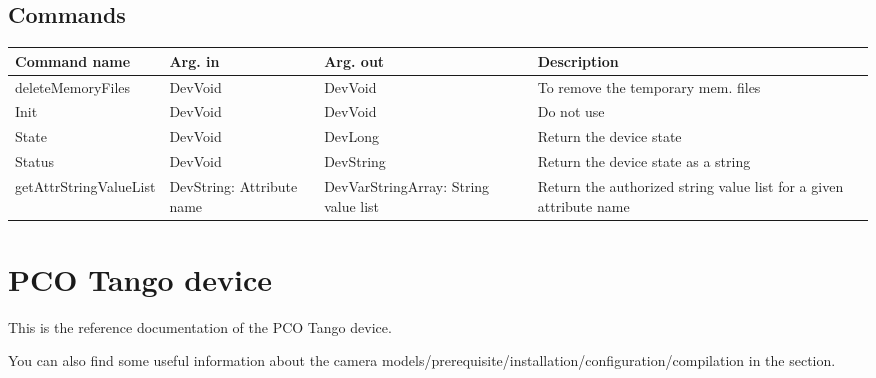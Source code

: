 \documentclass[letterpaper,10pt,english]{sphinxmanual}
\begin{document}
\section{Commands}
\label{Hamamatsu/hamamatsu:commands}
\begin{tabulary}{\linewidth}{|L|L|L|L|}
\hline
\textsf{\relax 
Command name
} & \textsf{\relax 
Arg. in
} & \textsf{\relax 
Arg. out
} & \textsf{\relax 
Description
}\\
\hline
deleteMemoryFiles
 & 
DevVoid
 & 
DevVoid
 & 
To remove the temporary mem. files
\\
\hline
Init
 & 
DevVoid
 & 
DevVoid
 & 
Do not use
\\
\hline
State
 & 
DevVoid
 & 
DevLong
 & 
Return the device state
\\
\hline
Status
 & 
DevVoid
 & 
DevString
 & 
Return the device state as a string
\\
\hline
getAttrStringValueList
 & 
DevString:
Attribute name
 & 
DevVarStringArray:
String value list
 & 
Return the authorized string value list for
a given attribute name
\\
\hline\end{tabulary}



\chapter{PCO Tango device}
\label{Pco/pco::doc}\label{Pco/pco:pco-tango-device}
This is the reference documentation of the PCO Tango device.

You can also find some useful information about the camera models/prerequisite/installation/configuration/compilation in the  section.
\end{document}
